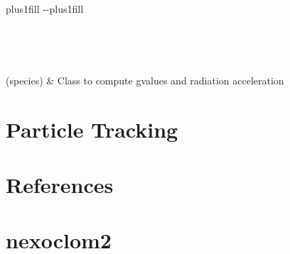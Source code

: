 \documentclass[letterpaper,10pt,english]{sphinxmanual}
\begin{document}
\begin{savenotes}
\sphinxatlongtablestart
\sphinxthistablewithglobalstyle
\sphinxthistablewithnovlinesstyle
\makeatletter
  \LTleft \@totalleftmargin plus1fill
  \LTright\dimexpr\columnwidth-\@totalleftmargin-\linewidth\relax plus1fill
\makeatother
\begin{longtable}{}
\sphinxtoprule
\endfirsthead

\\
\sphinxtoprule
\endhead

\sphinxbottomrule
{}\\
\endfoot

\endlastfoot
\sphinxtableatstartofbodyhook

\sphinxAtStartPar
{\hyperref[\detokenize{nexoclom2/nexoclom2.atomicdata.gvalues:nexoclom2.atomicdata.gvalues.gValue}]{}}(species)
&
\sphinxAtStartPar
Class to compute g\sphinxhyphen{}values and radiation acceleration
\\
\sphinxbottomrule
\end{longtable}
\sphinxtableafterendhook
\sphinxatlongtableend
\end{savenotes}

\sphinxstepscope


\section{Particle Tracking}
\label{\detokenize{nexoclom2/particle_tracking:particle-tracking}}\label{\detokenize{nexoclom2/particle_tracking::doc}}
\sphinxstepscope


\section{References}
\label{\detokenize{nexoclom2/references:references}}\label{\detokenize{nexoclom2/references::doc}}
\sphinxstepscope


\section{nexoclom2}
\label{\detokenize{apidocs/modules:nexoclom2}}\label{\detokenize{apidocs/modules::doc}}
\sphinxstepscope
\end{document}
